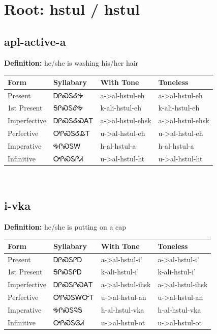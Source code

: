\documentclass{article}%
\begin{document}
%
\normalsize%
\section*{Root: hstul / hstul}%
\subsection*{apl-active-a}%
\textbf{Definition: }%
he/she is washing his/her hair%
\\[0.5em]%
\begin{tabular}{|l|l|l|l|}%
\hline%
\textbf{Form}&\textbf{Syllabary}&\textbf{With Tone}&\textbf{Toneless}\\%
\hline%
Present&ᎠᎵᏍᏚᎴᎭ&a{-}>al{-}hstul{-}eh&a{-}>al{-}hstul{-}eh\\%
1st Present&ᎦᎵᏍᏚᎴᎭ&k{-}ali{-}hstul{-}eh&k{-}ali{-}hstul{-}eh\\%
Imperfective&ᎠᎵᏍᏚᎴᏍᎪᎢ&a{-}>al{-}hstul{-}ehsk&a{-}>al{-}hstul{-}ehsk\\%
Perfective&ᎤᎵᏍᏚᎴᎲᎢ&u{-}>al{-}hstul{-}eh&u{-}>al{-}hstul{-}eh\\%
Imperative&ᎭᎵᏍᏚᎳ&h{-}al{-}hstul{-}a&h{-}al{-}hstul{-}a\\%
Infinitive&ᎤᎵᏍᏚᎵᏗ&u{-}>al{-}hstul{-}ht&u{-}>al{-}hstul{-}ht\\%
\hline%
\end{tabular}%
\\[1em]%
\subsection*{i-vka}%
\textbf{Definition: }%
he/she is putting on a cap%
\\[0.5em]%
\begin{tabular}{|l|l|l|l|}%
\hline%
\textbf{Form}&\textbf{Syllabary}&\textbf{With Tone}&\textbf{Toneless}\\%
\hline%
Present&ᎠᎵᏍᏚᎵᎠ&a{-}>al{-}hstul{-}i'&a{-}>al{-}hstul{-}i'\\%
1st Present&ᎦᎵᏍᏚᎵᎠ&k{-}ali{-}hstul{-}i'&k{-}ali{-}hstul{-}i'\\%
Imperfective&ᎠᎵᏍᏚᎵᏍᎪᎢ&a{-}>al{-}hstul{-}ihsk&a{-}>al{-}hstul{-}ihsk\\%
Perfective&ᎤᎵᏍᏚᎳᏅᎢ&u{-}>al{-}hstul{-}an&u{-}>al{-}hstul{-}an\\%
Imperative&ᎭᎵᏍᏚᎸᎦ&h{-}al{-}hstul{-}vka&h{-}al{-}hstul{-}vka\\%
Infinitive&ᎤᎵᏍᏚᎶᏗ&u{-}>al{-}hstul{-}ot&u{-}>al{-}hstul{-}ot\\%
\hline%
\end{tabular}%
\\[1em]%
\end{document}
